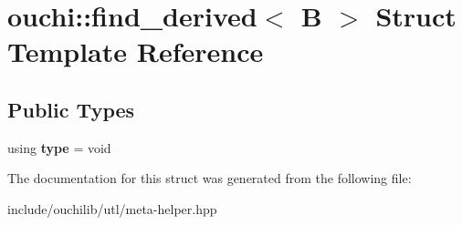 \hypertarget{structouchi_1_1find__derived_3_01_b_01_4}{}\section{ouchi\+::find\+\_\+derived$<$ B $>$ Struct Template Reference}
\label{structouchi_1_1find__derived_3_01_b_01_4}
\subsection*{Public Types}
\begin{DoxyCompactItemize}
\item 
\mbox{\label{structouchi_1_1find__derived_3_01_b_01_4_ac718a66560bb4a508770d2f02a34e4a7}} 
using {\bfseries type} = void
\end{DoxyCompactItemize}


The documentation for this struct was generated from the following file\+:\begin{DoxyCompactItemize}
\item 
include/ouchilib/utl/meta-\/helper.\+hpp\end{DoxyCompactItemize}
